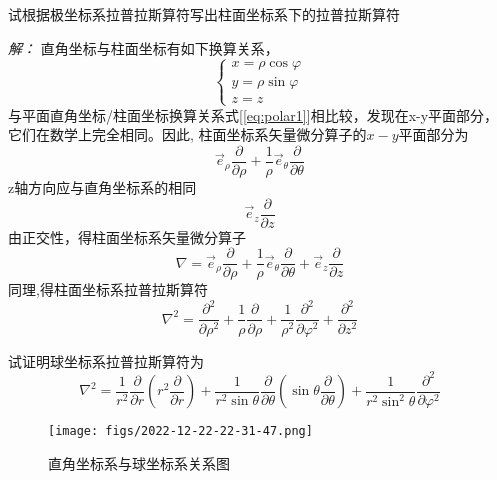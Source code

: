  \begin{example}
 试根据极坐标系拉普拉斯算符写出柱面坐标系下的拉普拉斯算符
\end{example}
\emph{解：}
 直角坐标与柱面坐标有如下换算关系，
 \begin{equation}\label{eq:cylindrical}
\begin{cases}
	x= \rho\cos \varphi  \\
	y= \rho\sin \varphi  \\
	z= z
\end{cases} 
\end{equation}
与平面直角坐标/柱面坐标换算关系式[\ref{eq:polar1}]相比较，发现在x-y平面部分，它们在数学上完全相同。因此, 柱面坐标系矢量微分算子的$x-y$平面部分为
$$
\vec{e}_{\rho} \frac{\partial}{\partial \rho}+\frac{1}{\rho} \vec{e}_{\theta} \frac{\partial}{\partial \theta}
$$ 
z轴方向应与直角坐标系的相同
$$\vec{e}_{z} \frac{\partial}{\partial z} $$
由正交性，得柱面坐标系矢量微分算子
$$\nabla = \vec{e}_{\rho} \frac{\partial}{\partial \rho}+\frac{1}{\rho} \vec{e}_{\theta} \frac{\partial}{\partial \theta} + \vec{e}_{z} \frac{\partial}{\partial z} $$
同理,得柱面坐标系拉普拉斯算符 
  $$\nabla^2=\frac{\partial^2}{\partial \rho^2}+\frac{1}{\rho} \frac{\partial}{\partial \rho}+\frac{1}{\rho^2} \frac{\partial^2}{\partial \varphi^2}+\frac{\partial^2}{\partial z^2}$$
\begin{example}
	试证明球坐标系拉普拉斯算符为
	$$ \displaystyle \nabla ^{2} =\frac{1}{r^2} \frac{\partial }{\partial r} (r^2\frac{\partial }{\partial r} )+
	\frac{1}{r^2 \sin \theta  } \frac{\partial }{\partial \theta } (\sin \theta \frac{\partial }{\partial \theta } )
	+\frac{1}{r^2 \sin^2 \theta  } \frac{\partial^2}{\partial\varphi ^2} $$  
   \end{example}	
   \begin{figure}[h]
	\centering
	\texttt{[image: figs/2022-12-22-22-31-47.png]}
	\caption{直角坐标系与球坐标系关系图}
\end{figure}
